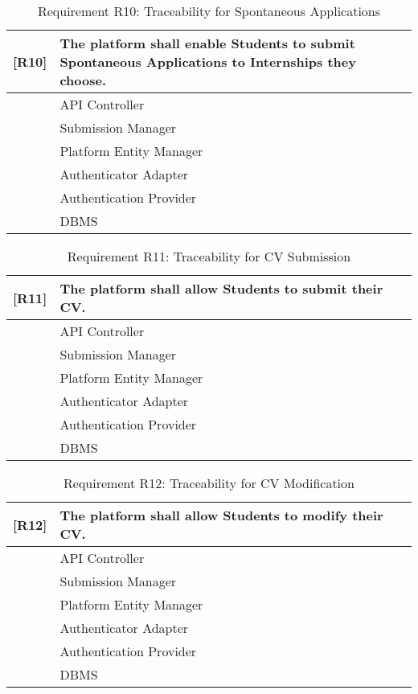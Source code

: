 \begin{table}[H]
    \centering
    \begin{tabular}{|p{1cm}|p{14cm}|}
    \hline
    \textbf{[R10]} & \textbf{The platform shall enable Students to submit Spontaneous Applications to Internships they choose.} \\ \hline
    [C1] & API Controller \\ \hline
    [C5] & Submission Manager \\ \hline
    [C10] & Platform Entity Manager \\ \hline
    [C11] & Authenticator Adapter \\ \hline
    [E3] & Authentication Provider \\ \hline
    [E4] & DBMS \\ \hline
    \end{tabular}
    \caption{Requirement R10: Traceability for Spontaneous Applications}
    \label{tab:RT10}
\end{table}

\begin{table}[H]
    \centering
    \begin{tabular}{|p{1cm}|p{14cm}|}
    \hline
    \textbf{[R11]} & \textbf{The platform shall allow Students to submit their CV.} \\ \hline
    [C1] & API Controller \\ \hline
    [C5] & Submission Manager \\ \hline
    [C10] & Platform Entity Manager \\ \hline
    [C11] & Authenticator Adapter \\ \hline
    [E3] & Authentication Provider \\ \hline
    [E4] & DBMS \\ \hline
    \end{tabular}
    \caption{Requirement R11: Traceability for CV Submission}
    \label{tab:RT11}
\end{table}

\begin{table}[H]
    \centering
    \begin{tabular}{|p{1cm}|p{14cm}|}
    \hline
    \textbf{[R12]} & \textbf{The platform shall allow Students to modify their CV.} \\ \hline
    [C1] & API Controller \\ \hline
    [C5] & Submission Manager \\ \hline
    [C10] & Platform Entity Manager \\ \hline
    [C11] & Authenticator Adapter \\ \hline
    [E3] & Authentication Provider \\ \hline
    [E4] & DBMS \\ \hline
    \end{tabular}
    \caption{Requirement R12: Traceability for CV Modification}
    \label{tab:RT12}
\end{table}

